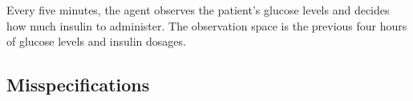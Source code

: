 Every five minutes, the agent observes the patient's glucose levels and decides how much insulin to administer. The observation space is the previous four hours of glucose levels and insulin dosages. %


\subsection{Misspecifications}
\label{sec:misspec}

